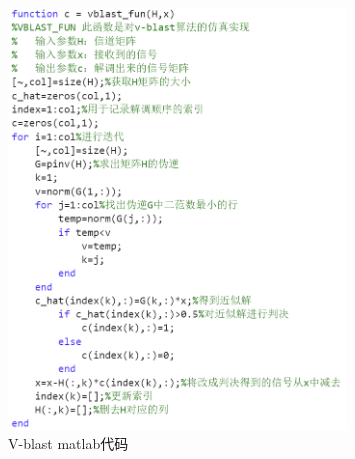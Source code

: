\documentclass[a4paper,12pt]{article}
\begin{document}
	\begin{figure}[h]
		\centering
		\includegraphics[width=0.8\textwidth]{3.png}
		\caption{V-blast matlab代码}
	\end{figure}
	\newpage
\end{document}
